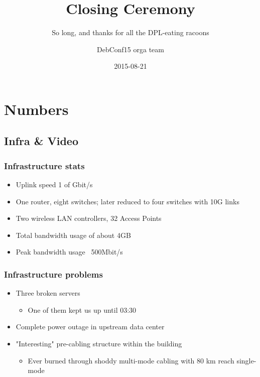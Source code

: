 \documentclass[t]{beamer}
\title{Closing Ceremony}
\subtitle{So long, and thanks for all the DPL-eating racoons}
\author{DebConf15 orga team}
\date{2015-08-21}
\begin{document}
\setcounter{tocdepth}{1}

\begin{frame}
	\titlepage
\end{frame}

\section{Numbers}


\subsection{Infra \& Video}

\begin{frame}
	\frametitle{Infrastructure stats}
	\begin{itemize}
		\item Uplink speed 1 of Gbit/s
		\item One router, eight switches; later reduced to four switches with 10G links
		\item Two wireless LAN controllers, 32 Access Points
		\item Total bandwidth usage of about 4GB
		\item Peak bandwidth usage ~500Mbit/s
	\end{itemize}
\end{frame}

\begin{frame}
	\frametitle{Infrastructure problems}
	\begin{itemize}
		\item Three broken servers
		\begin{itemize}
			\item One of them kept us up until 03:30
		\end{itemize}
		\item Complete power outage in upstream data center
		\item "Interesting" pre-cabling structure within the building
		\begin{itemize}
			\item Ever burned through shoddy multi-mode cabling with 80 km reach single-mode 
		\end{itemize}
	\end{itemize}
\end{frame}
\end{document}
